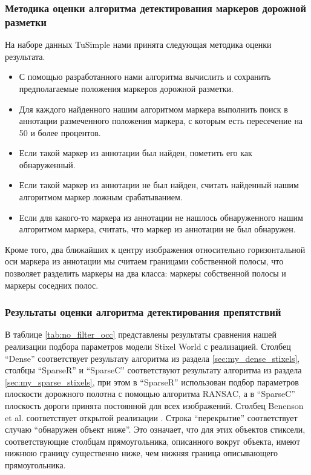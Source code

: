\documentclass[aps,%
14pt,%
final,%
oneside,
onecolumn,%
musixtex, %
superscriptaddress,%
centertags]{extarticle} %
\begin{document}
\subsubsection{Методика оценки алгоритма детектирования маркеров дорожной разметки}

На наборе данных TuSimple нами принята следующая методика оценки результата.

\begin{itemize}
\item С помощью разработанного нами алгоритма вычислить и сохранить предполагаемые положения маркеров дорожной разметки.
\item Для каждого найденного нашим алгоритмом маркера выполнить поиск в аннотации размеченного положения маркера, с которым есть пересечение на 50 и более процентов.
\item Если такой маркер из аннотации был найден, пометить его как обнаруженный.
\item Если такой маркер из аннотации не был найден, считать найденный нашим алгоритмом маркер ложным срабатыванием.
\item Если для какого-то маркера из аннотации не нашлось обнаруженного нашим алгоритмом маркера, считать, что маркер из аннотации не был обнаружен.
\end{itemize}

Кроме того, два ближайших к центру изображения относительно горизонтальной оси маркера из аннотации мы считаем границами собственной полосы, что позволяет разделить маркеры на два класса: маркеры собственной полосы и маркеры соседних полос.

\subsubsection{Результаты оценки алгоритма детектирования препятствий}

В таблице \ref{tab:no_filter_occ} представлены результаты сравнения нашей реализации подбора параметров модели Stixel World с реализацией\cite{doppia_repo}. Столбец ``Dense'' соответствует результату алгоритма из раздела \ref{sec:my_dense_stixels}, столбцы ``SparseR'' и ``SparseC'' соответствуют результату алгоритма из раздела \ref{sec:my_sparse_stixels}, при этом в ``SparseR'' использован подбор параметров плоскости дорожного полотна с помощью алгоритма RANSAC, а в ``SparseC'' плоскость дороги принята постоянной для всех изображений. Столбец Benenson et al. соответствует открытой реализации \cite{doppia_repo}. Строка ``перекрытие'' соответствует случаю ``обнаружен объект ниже''. Это означает, что для этих объектов стиксели, соответствующие столбцам прямоугольника, описанного вокруг объекта, имеют нижнюю границу существенно ниже, чем нижняя граница описывающего прямоугольника. 
\end{document}
